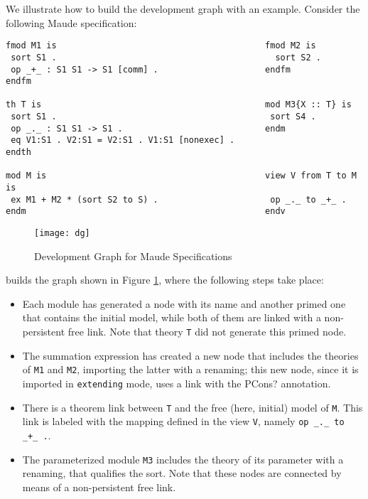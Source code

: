 We illustrate how to build the development graph with an example. Consider
the following Maude specification:

{\codesize
\begin{verbatim}
fmod M1 is                                         fmod M2 is
 sort S1 .                                           sort S2 .
 op _+_ : S1 S1 -> S1 [comm] .                     endfm
endfm

th T is                                            mod M3{X :: T} is
 sort S1 .                                          sort S4 .
 op _._ : S1 S1 -> S1 .                            endm
 eq V1:S1 . V2:S1 = V2:S1 . V1:S1 [nonexec] . 
endth

mod M is                                           view V from T to M is
 ex M1 + M2 * (sort S2 to S) .                      op _._ to _+_ .
endm                                               endv
\end{verbatim}
}

\begin{figure}[t]
\begin{center}
\texttt{[image: dg]}
\caption{Development Graph for Maude Specifications\label{fig:dg}}
\end{center}
\end{figure}

\noindent \Hets builds the graph shown in Figure \ref{fig:dg},
where the following steps take place:
\begin{itemize}
\item Each module has generated a node with its name and
another primed one that contains the initial model, while both of them
are linked with a non-persistent free link. Note that theory \verb"T" did not
generate this primed node.
\item The summation expression has created a new node that includes the theories
of \verb"M1" and \verb"M2", importing the latter with a renaming; this new
node, since it is imported in \verb"extending" mode, uses a link with the
\textsf{PCons?} annotation.
\item There is a theorem link between \verb"T" and the free (here, initial) model of
\verb"M". This link is labeled with the mapping defined in the view \verb"V",
namely \verb"op _._ to _+_ .".
\item The parameterized module \verb"M3" includes the theory of its parameter
with a renaming, that qualifies the sort. Note that these nodes are connected
by means of a non-persistent free link.
\end{itemize}

